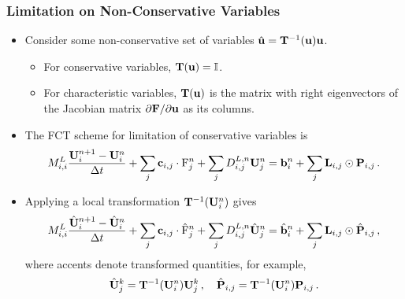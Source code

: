 \begin{frame}
\frametitle{Limitation on Non-Conservative Variables}

\begin{itemize}
  \item Consider some non-conservative set of variables
    $\hat{\mathbf{u}} = \mathbf{T}^{-1}(\mathbf{u})\mathbf{u}$.
    \begin{itemize}
      \item For \textcolor{secondarycolorheavy}{conservative} variables,
        $\mathbf{T}(\mathbf{u})=\mathbb{I}$.
      \item For \textcolor{secondarycolorheavy}{characteristic} variables,
        $\mathbf{T}(\mathbf{u})$ is the matrix with right eigenvectors
        of the Jacobian matrix $\partial\consfluxvector/\partial\vectorsolution$
        as its columns.
    \end{itemize}
  \item The FCT scheme for limitation of conservative variables is
    \begin{equation}
      \lumpedmassentry
        \frac{\solutionvector_i^{n+1}-\solutionvector_i^n}{\dt}
        + \sum_j\gradiententry\cdot\consfluxinterpolant_j^n
        + \sum_j\diffusionmatrixletter\ij^{L,n}\solutionvector_j^n
        = \ssrhs_i^n + \sum_j\limitermatrix\ij\odot\correctionfluxmatrix\ij \eqp
    \end{equation}
  \item Applying a local transformation $\mathbf{T}^{-1}(\mathbf{U}_i^n)$ gives
    \begin{equation}
      \lumpedmassentry
        \frac{\hat{\solutionvector}_i^{n+1}-\hat{\solutionvector}_i^n}{\dt}
        + \sum_j\gradiententry\cdot\hat{\consfluxinterpolant}_j^n
        + \sum_j\diffusionmatrixletter\ij^{L,n}\hat{\solutionvector}_j^n
        = \hat{\ssrhs}_i^n + \sum_j\limitermatrix\ij\odot\hat{\correctionfluxmatrix}\ij
        \eqc
    \end{equation}
    where accents denote transformed quantities, for example,
    \begin{equation}
      \hat{\solutionvector}_j^k
        = \mathbf{T}^{-1}(\solutionvector_i^n)\solutionvector_j^k
      \eqc \quad
      \hat{\correctionfluxmatrix}\ij
        = \mathbf{T}^{-1}(\solutionvector_i^n)\correctionfluxmatrix\ij
      \eqp
    \end{equation}
\end{itemize}

\end{frame}
